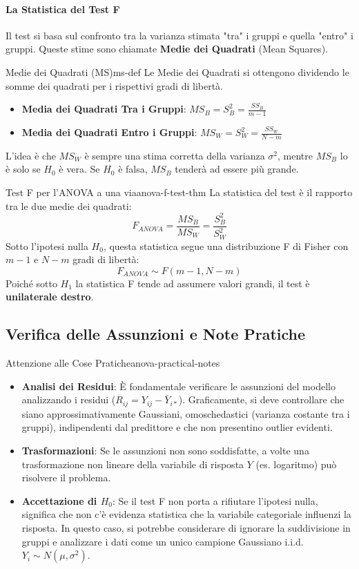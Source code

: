 \paragraph{La Statistica del Test F}
Il test si basa sul confronto tra la varianza stimata "tra" i gruppi e quella "entro" i gruppi. Queste stime sono chiamate \textbf{Medie dei Quadrati} (Mean Squares).

\begin{definizione}{Medie dei Quadrati (MS)}{ms-def}
Le Medie dei Quadrati si ottengono dividendo le somme dei quadrati per i rispettivi gradi di libertà.
\begin{itemize}
    \item \textbf{Media dei Quadrati Tra i Gruppi}: \( MS_B = S_B^2 = \frac{SS_B}{m-1} \)
    \item \textbf{Media dei Quadrati Entro i Gruppi}: \( MS_W = S_W^2 = \frac{SS_W}{N-m} \)
\end{itemize}
L'idea è che \(MS_W\) è sempre una stima corretta della varianza \(\sigma^2\), mentre \(MS_B\) lo è solo se \(H_0\) è vera. Se \(H_0\) è falsa, \(MS_B\) tenderà ad essere più grande.
\end{definizione}

\begin{teorema}{Test F per l'ANOVA a una via}{anova-f-test-thm}
La statistica del test è il rapporto tra le due medie dei quadrati:
\[ F_{ANOVA} = \frac{MS_B}{MS_W} = \frac{S_B^2}{S_W^2} \]
Sotto l'ipotesi nulla \(H_0\), questa statistica segue una distribuzione F di Fisher con \(m-1\) e \(N-m\) gradi di libertà:
\[ F_{ANOVA} \sim F(m-1, N-m) \]
Poiché sotto \(H_1\) la statistica F tende ad assumere valori grandi, il test è \textbf{unilaterale destro}.
\end{teorema}

\subsection{Verifica delle Assunzioni e Note Pratiche}
\begin{nota}{Attenzione alle Cose Pratiche}{anova-practical-notes}
\begin{itemize}
    \item \textbf{Analisi dei Residui}: È fondamentale verificare le assunzioni
    del modello analizzando i residui (\(R_{ij} = Y_{ij} - \bar{Y}_{i*}\)).
    Graficamente, si deve controllare che siano approssimativamente Gaussiani,
    omoschedastici (varianza costante tra i gruppi), indipendenti dal predittore
    e che non presentino outlier evidenti.
    \item \textbf{Trasformazioni}: Se le assunzioni non sono soddisfatte, a
    volte una trasformazione non lineare della variabile di risposta \(Y\) (es.
    logaritmo) può risolvere il problema.
    \item \textbf{Accettazione di \(H_0\)}: Se il test F non porta a rifiutare
    l'ipotesi nulla, significa che non c'è evidenza statistica che la variabile
    categoriale influenzi la risposta. In questo caso, si potrebbe considerare
    di ignorare la suddivisione in gruppi e analizzare i dati come un unico
    campione Gaussiano i.i.d. \(Y_i \sim N(\mu, \sigma^2)\).
\end{itemize}
\end{nota}
